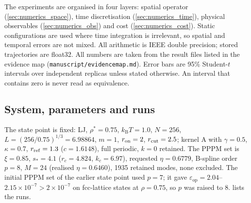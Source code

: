 \documentclass[11pt]{article}
\DeclareRobustCommand{\_}{\textunderscore\allowbreak}
\theoremstyle{remark}
\theoremstyle{definition}
\newcommand{\kT}{k_{\mathrm B}T}
\newcommand{\eop}{\varepsilon_{\mathrm{op}}}
\begin{document}
The experiments are organised in four layers: spatial operator (\cref{sec:numerics_space}), time discretisation
(\cref{sec:numerics_time}), physical observables (\cref{sec:numerics_obs}) and cost (\cref{sec:numerics_cost}).
Static configurations are used where time integration is irrelevant, so spatial and temporal errors are not mixed.
All arithmetic is IEEE double precision; stored trajectories are float32. All numbers are taken from the result
files listed in the evidence map (\texttt{manuscript/evidence\_map.md}). Error bars are 95\% Student-$t$ intervals over
independent replicas unless stated otherwise. An interval that contains zero is never read as equivalence.

\subsection{System, parameters and runs}\label{sec:setup}

The state point is fixed: LJ, $\rho^*=0.75$, $\kT=1.0$, $N=256$, $L=(256/0.75)^{1/3}=6.98864$, $m=1$,
$r_{\rm on}=2$, $r_{\rm cut}=2.5$; kernel A with $\gamma=0.5$, $\kappa=0.7$, $r_{\rm ref}=1.3$ ($c=1.6148$),
full periodic, $k=0$ retained. The PPPM set is $\xi=0.85$, $s_\ast=4.1$ ($r_c=4.824$, $k_c=6.97$), requested
$\eta=0.6779$, B-spline order $p=8$, $M=24$ (realised $\eta=0.6460$), 1935 retained modes, none excluded. The
initial PPPM set of the earlier state point used $p=7$; it gave $\eop=2.04$--$2.15\times10^{-7}>2\times10^{-7}$ on
fcc-lattice states at $\rho=0.75$, so $p$ was raised to 8.  lists the runs.
\end{document}
